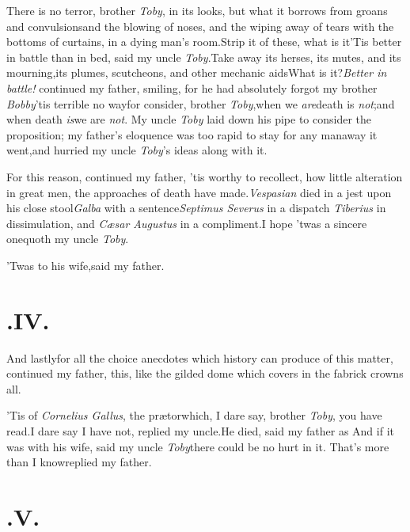 \documentclass{article}
\begin{document}
There is no terror, brother \textit{Toby}, in its looks, but what
it borrows from groans and convulsions\tsk and the blowing of
noses, and the wiping away of tears with the bottoms of curtains, in
a dying man’s room.\tsk Strip it of these, what is
it\tsk ’Tis better in battle than in bed, said my uncle
\textit{Toby}.\tsk Take away its herses, its mutes, and its
mourning,\tsk its plumes, scutcheons, and other mechanic
aids\tsk What is it?\tsk \textit{Better in battle!} continued my
father, smiling, for he had absolutely forgot my brother
\textit{Bobby}\tsk ’tis terrible no way\tsk for consider,
brother \textit{Toby},\tsk when we \textit{are}\tsk death is
\textit{not};\tsk and when death \textit{is}\tsk we are \textit{not}.
My uncle \textit{Toby} laid down his pipe to consider the
proposition; my father’s eloquence was too rapid to stay for
any man\tsk away it went,\break\tsk and hurried my uncle
\textit{Toby}’s ideas along with it.\tsh

For this reason, continued my father, ’tis worthy to
recollect, how little alte\-ration in great men, the
approaches of
death have made.\tsk \textit{Vespasian} died in a 
jest upon his close stool\tsk \textit{Galba} with a\break
sentence\tsk \textit{Septimus Severus} in a dispatch\break
\tsk \textit{Tiberius} in dissimulation, and \textit{Cæsar Augustus} in a compliment.\tsk I hope
’twas a sincere one\tsk quoth my uncle \textit{Toby}.


\tsk ’Twas to his wife,\tsk said my father.

\section{.\enspace  IV.}

\quad\tsh  And lastly\tsk for all the choice anecdotes which
history can produce of this matter, continued my father,\tsk
this, like the gilded dome which covers in the fabrick\tsk
crowns all.\tsk

’Tis of \textit{Cornelius Gallus}, the
prætor\tsk which, I dare say, brother \textit{Toby}, you have
read.\tsk I dare say I have not, replied my uncle.\tsk He died,
said my father as\break
\stick{\astfill}\break
\tsk And if it was with his wife, said my uncle \textit{Toby}\tsk there could be no
hurt in it.
\tsk That’s more than I know\tsk replied my father.

\enlargethispage\baselineskip

\section{.\enspace  V.}
\end{document}
